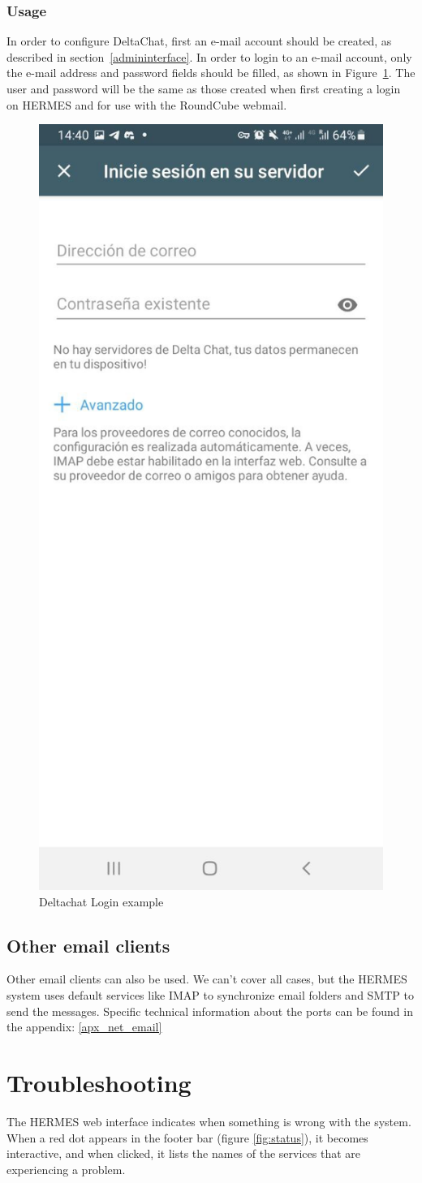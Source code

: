 \documentclass[11pt,a4paper]{article}
\begin{document}
\subsubsection{Usage}

In order to configure DeltaChat, first an e-mail account should be created, as described in section~\ref{admininterface}. In order to login to an e-mail account, only the e-mail address and password fields should be filled, as shown in Figure~\ref{fig:deltachat-login}. The user and password will be the same as those created when first creating a login on HERMES and for use with the RoundCube webmail.

\begin{figure}[H]
    \centering
    \includegraphics[width=0.3\columnwidth]{screenshots/deltachat/es/login_es.jpeg}
    	\caption{Deltachat Login example}
	\vspace{-10pt}
    \label{fig:deltachat-login}
\end{figure}

\subsection{Other email clients}
Other email clients can also be used. We can't cover all cases, but the HERMES system uses default services like IMAP to synchronize email folders and SMTP to send the messages. Specific technical information about the ports can be found in the appendix: \ref{apx_net_email}

\section{Troubleshooting}
The HERMES web interface indicates when something is wrong with the system. When a red dot appears in the footer bar (figure \ref{fig:status}), it becomes interactive, and when clicked, it lists the names of the services that are experiencing a problem.
\end{document}
